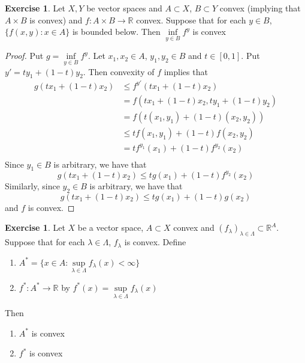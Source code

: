 \documentclass[12pt]{amsart}
\theoremstyle{definition}
\newtheorem{ex}[definition]{Exercise}
\newcommand{\lam}{\lambda}
\newcommand{\Lam}{\Lambda}
\newcommand{\R}{\mathbb{R}}
\DeclareMathOperator*{\0}{\mbf{0}}
\DeclareMathOperator*{\1}{\mbf{1}}
\newcommand{\lex}[1]{\label{ex:#1}}
\begin{document}
	\begin{ex} \lex{91014}
	Let $X, Y$ be vector spaces and $A \subset X$, $B \subset Y$ convex (implying that $A \times B$ is convex)  and $f:A \times B \rightarrow \R$ convex. Suppose that for each $y \in B$, $\{f(x, y): x \in A\}$ is bounded below. Then $\inf\limits_{y \in B}f^y$ is convex
	\end{ex}
	
	\begin{proof}
	Put $g = \inf\limits_{y \in B}f^y$. 
	Let $x_1, x_2 \in A$, $y_1, y_2 \in B$ and $t \in [0,1]$. Put $y'= ty_1 + (1-t)y_2$. Then convexity of $f$ implies that
	\begin{align*}
	g(tx_1 + (1-t)x_2) 
	& \leq f^{y'}(tx_1 + (1-t)x_2) \\
	&= f(tx_1 + (1-t)x_2, ty_1 + (1-t)y_2)\\
	&= f(t(x_1,y_1) + (1-t)(x_2, y_2)) \\
	& \leq tf(x_1, y_1) + (1-t)f(x_2, y_2) \\
	&= tf^{y_1}(x_1) + (1-t)f^{y_2}(x_2) \\
	\end{align*}
	Since $y_1 \in B$ is arbitrary, we have that $$g(tx_1 + (1-t)x_2) \leq tg(x_1) + (1-t)f^{y_2}(x_2)$$ Similarly, since $y_2 \in B$ is arbitrary, we have that $$g(tx_1 + (1-t)x_2) \leq tg(x_1) + (1-t)g(x_2)$$ and $f$ is convex.
	\end{proof}	

	\begin{ex} \lex{91015}
	Let $X$ be a vector space, $A \subset X$ convex and $ (f_{\lam})_{\lam \in \Lam} \subset \R^A$. Suppose that for each $\lam \in \Lam$, $f_\lam$ is convex. Define 
	\begin{enumerate}
		\item $A^* = \{x \in A: \sup\limits_{\lam \in \Lam} f_{\lam}(x) < \infty\}$
		\item $f^*:A^* \rightarrow \R$ by $f^*(x) =  \sup\limits_{\lam \in \Lam} f_{\lam}(x)$
	\end{enumerate}
Then
	\begin{enumerate}
		\item $A^*$ is convex 
		\item $f^*$ is convex
	\end{enumerate}
	\end{ex}
	
\end{document}
